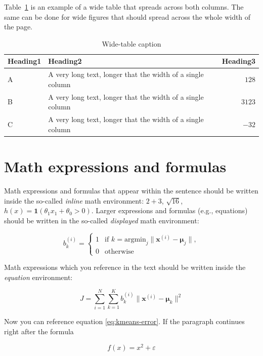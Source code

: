 \documentclass[10pt, a4paper]{article}
\begin{document}
Table~\ref{tab:wide-table} is an example of a wide table that spreads across both columns. The same can be done for wide figures that should spread across the whole width of the page.

\begin{table}
\caption{Wide-table caption}
\label{tab:wide-table}
\begin{center}
\begin{tabular}{llr}
\toprule
Heading1 & Heading2 & Heading3\\
\midrule
A & A very long text, longer that the width of a single column & $128$\\
B & A very long text, longer that the width of a single column & $3123$\\
C & A very long text, longer that the width of a single column & $-32$\\
\bottomrule
\end{tabular}
\end{center}
\end{table}

\section{Math expressions and formulas}

Math expressions and formulas that appear within the sentence should be written inside the so-called \emph{inline} math environment: $2+3$, $\sqrt{16}$, $h(x)=\mathbf{1}(\theta_1 x_1 + \theta_0>0)$. Larger expressions and formulas (e.g., equations) should be written in the so-called \emph{displayed} math environment:

\[
b^{(i)}_k = \begin{cases}
1 & \text{if
    $k = \text{argmin}_j \| \mathbf{x}^{(i)} - \mathbf{\mu}_j \|,$}\\
0 & \text{otherwise}
\end{cases}
\]

Math expressions which you reference in the text should be written inside the \textit{equation} environment:

\begin{equation}\label{eq:kmeans-error}
J = \sum_{i=1}^N \sum_{k=1}^K
b^{(i)}_k \| \mathbf{x}^{(i)} - \mathbf{\mu}_k \|^2
\end{equation}

Now you can reference equation \eqref{eq:kmeans-error}. If the paragraph continues right after the formula

\begin{equation}
f(x) = x^2 + \varepsilon
\end{equation}
\end{document}
